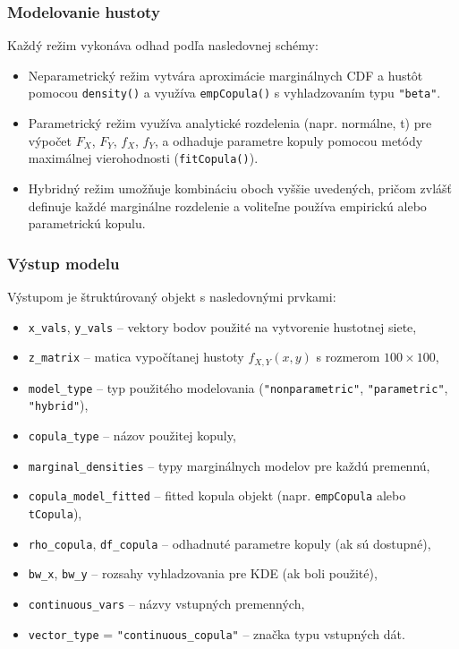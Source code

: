 \subsubsection{Modelovanie hustoty}

Každý režim vykonáva odhad podľa nasledovnej schémy:

\begin{itemize}
  \item Neparametrický režim vytvára aproximácie marginálnych CDF a hustôt pomocou \texttt{density()} a využíva \texttt{empCopula()} s vyhladzovaním typu \texttt{"beta"}.
  \item Parametrický režim využíva analytické rozdelenia (napr. normálne, t) pre výpočet $F_X$, $F_Y$, $f_X$, $f_Y$, a odhaduje parametre kopuly pomocou metódy maximálnej vierohodnosti (\texttt{fitCopula()}).
  \item Hybridný režim umožňuje kombináciu oboch vyššie uvedených, pričom zvlášť definuje každé marginálne rozdelenie a voliteľne používa empirickú alebo parametrickú kopulu.
\end{itemize}

\subsubsection{Výstup modelu}

Výstupom je štruktúrovaný objekt s nasledovnými prvkami:

\begin{itemize}
  \item \texttt{x\_vals}, \texttt{y\_vals} – vektory bodov použité na vytvorenie hustotnej siete,
  \item \texttt{z\_matrix} – matica vypočítanej hustoty $f_{X,Y}(x,y)$ s rozmerom $100 \times 100$,
  \item \texttt{model\_type} – typ použitého modelovania (\texttt{"nonparametric"}, \texttt{"parametric"}, \texttt{"hybrid"}),
  \item \texttt{copula\_type} – názov použitej kopuly,
  \item \texttt{marginal\_densities} – typy marginálnych modelov pre každú premennú,
  \item \texttt{copula\_model\_fitted} – fitted kopula objekt (napr. \texttt{empCopula} alebo \texttt{tCopula}),
  \item \texttt{rho\_copula}, \texttt{df\_copula} – odhadnuté parametre kopuly (ak sú dostupné),
  \item \texttt{bw\_x}, \texttt{bw\_y} – rozsahy vyhladzovania pre KDE (ak boli použité),
  \item \texttt{continuous\_vars} – názvy vstupných premenných,
  \item \texttt{vector\_type} = \texttt{"continuous\_copula"} – značka typu vstupných dát.
\end{itemize}

